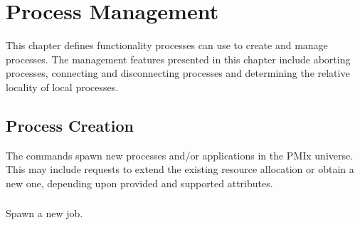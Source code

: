 \chapter{Process Management}
\label{chap:api_proc_mgmt}

This chapter defines functionality processes can use to create and manage processes. The management features presented in this chapter include aborting processes, connecting and disconnecting processes and determining the relative locality of local processes.

\section{Process Creation}
\label{chap:api_proc_mgmt:spawn}

The  commands spawn new processes and/or applications in the \ac{PMIx} universe. This may include requests to extend the existing resource allocation or obtain a new one, depending upon provided and supported attributes.

\subsection{}

\summary

Spawn a new job.

\format


\begin{arglist}
\end{arglist}

